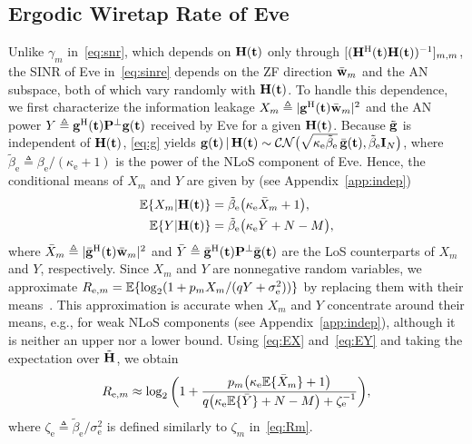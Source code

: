 \documentclass[journal]{IEEEtran}
\begin{document}
\subsection{Ergodic Wiretap Rate of Eve}\label{sec:eve}

Unlike $\gamma_m$ in~\eqref{eq:snr}, which depends on $\mathbf{H}(\mathbf{t})$ only through $[(\mathbf{H}^{\mathrm H}(\mathbf{t})\mathbf{H}(\mathbf{t}))^{-1}]_{m,m}$, the SINR of Eve in~\eqref{eq:sinre} depends on the ZF direction $\bar{\mathbf{w}}_m$ and the AN subspace, both of which vary randomly with $\mathbf{H}(\mathbf{t})$. To handle this dependence, we first characterize the information leakage $X_m\triangleq|\mathbf{g}^{\mathrm H}(\mathbf{t})\bar{\mathbf{w}}_m|^2$ and the AN power $Y\triangleq\mathbf{g}^{\mathrm H}(\mathbf{t})\mathbf{P}^{\perp}\mathbf{g}(\mathbf{t})$ received by Eve for a given $\mathbf{H}(\mathbf{t})$. Because $\tilde{\mathbf{g}}$ is independent of $\mathbf{H}(\mathbf{t})$, \eqref{eq:g} yields $\mathbf{g}(\mathbf{t})\,|\,\mathbf{H}(\mathbf{t})\sim\mathcal{CN}\big(\sqrt{\kappa_{\mathrm e}\tilde\beta_{\mathrm e}}\,\bar{\mathbf{g}}(\mathbf{t}),\tilde\beta_{\mathrm e}\mathbf{I}_N\big)$, where $\tilde\beta_{\mathrm e}\triangleq\beta_{\mathrm e}/(\kappa_{\mathrm e}+1)$ is the power of the NLoS component of Eve. Hence, the conditional means of $X_m$ and $Y$ are given by (see Appendix~\ref{app:indep})
\begin{align}
\mathbb{E}\{X_m|\mathbf{H}(\mathbf{t})\}&=\tilde\beta_{\mathrm e}\big(\kappa_{\mathrm e}\bar X_m+1\big),\label{eq:EX}\\
\mathbb{E}\{Y|\mathbf{H}(\mathbf{t})\}&=\tilde\beta_{\mathrm e}\big(\kappa_{\mathrm e}\bar Y+N-M\big),\label{eq:EY}
\end{align}
where $\bar X_m\triangleq|\bar{\mathbf{g}}^{\mathrm H}(\mathbf{t})\bar{\mathbf{w}}_m|^2$ and $\bar Y\triangleq\bar{\mathbf{g}}^{\mathrm H}(\mathbf{t})\mathbf{P}^{\perp}\bar{\mathbf{g}}(\mathbf{t})$ are the LoS counterparts of $X_m$ and $Y$, respectively. Since $X_m$ and $Y$ are nonnegative random variables, we approximate $R_{\mathrm{e},m}=\mathbb{E}\{\log_2(1+p_mX_m/(qY+\sigma_{\mathrm e}^2))\}$ by replacing them with their means~\cite[Lemma~1]{ZhangJSTSP2014}. This approximation is accurate when $X_m$ and $Y$ concentrate around their means, e.g., for weak NLoS components (see Appendix~\ref{app:indep}), although it is neither an upper nor a lower bound. Using \eqref{eq:EX} and~\eqref{eq:EY} and taking the expectation over $\tilde{\mathbf{H}}$, we obtain
\begin{equation}\label{eq:Re0}
R_{\mathrm{e},m}\approx\log_2\bigg(1+\frac{p_m\big(\kappa_{\mathrm e}\mathbb{E}\{\bar X_m\}+1\big)}{q\big(\kappa_{\mathrm e}\mathbb{E}\{\bar Y\}+N-M\big)+\zeta_{\mathrm e}^{-1}}\bigg),
\end{equation}
where $\zeta_{\mathrm e}\triangleq\tilde\beta_{\mathrm e}/\sigma_{\mathrm e}^2$ is defined similarly to $\zeta_m$ in~\eqref{eq:Rm}.
\end{document}
